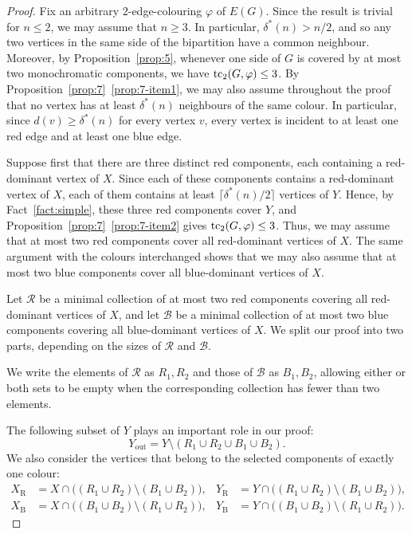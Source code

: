 \documentclass[12pt,reqno,a4paper]{amsart}
\def\tc{\mathop{\text{\rm tc}}\nolimits}
\newcommand{\out}{\mathrm{out}}
\newcommand{\R}{\mathrm{R}}
\newcommand{\B}{\mathrm{B}}
\begin{document}
\begin{proof}
Fix an arbitrary $2$-edge-colouring $\varphi$ of $E(G)$.
Since the result is trivial for $n\le 2$, we may assume that $n\ge 3$. In
particular, $\delta^*(n)>n/2$, and so any two vertices in the same side of the
bipartition have a common neighbour. Moreover, by Proposition~\ref{prop:5},
whenever one side of $G$ is covered by at most two monochromatic components, we
have $\tc_2(G,\varphi)\le 3$. By Proposition~\ref{prop:7}~\ref{prop:7-item1}, we may
also assume throughout the proof that no vertex has at least $\delta^*(n)$
neighbours of the same colour. In particular, since $d(v)\ge \delta^*(n)$ for
every vertex $v$, every vertex is incident to at least one red edge and at least
one blue edge.
 
Suppose first that there are three distinct red components, each containing a
red-dominant vertex of $X$. Since each of these components contains a
red-dominant vertex of $X$, each of them contains at least $\lceil
\delta^*(n)/2\rceil$ vertices of $Y$. Hence, by Fact~\ref{fact:simple}, these
three red components cover $Y$, and Proposition~\ref{prop:7}~\ref{prop:7-item2}
gives $\tc_2(G,\varphi)\le 3$. Thus, we may assume that at most two red components cover
all red-dominant vertices of $X$. The same argument with the colours
interchanged shows that we may also assume that at most two blue components
cover all blue-dominant vertices of $X$.

Let $\mathcal R$ be a minimal collection of at most two red components covering
all red-dominant vertices of $X$, and let $\mathcal B$ be a minimal collection
of at most two blue components covering all blue-dominant vertices of $X$. We
split our proof into two parts, depending on the sizes of $\mathcal R$ and
$\mathcal B$.

We write the elements of $\mathcal R$ as $R_1,R_2$ and those of $\mathcal B$ as
$B_1,B_2$, allowing either or both sets to be empty when the
corresponding collection has fewer than two elements.

The following subset of $Y$ plays an important role in our proof:
\begin{equation*}
Y_{\out} = Y \setminus (R_1 \cup R_2 \cup B_1 \cup B_2).
\end{equation*}
We also consider the vertices that belong to the selected components of exactly
one colour:
\begin{align*}
X_{\R} &= X\cap\bigl((R_1\cup R_2)\setminus(B_1\cup B_2)\bigr), &
Y_{\R} &= Y\cap\bigl((R_1\cup R_2)\setminus(B_1\cup B_2)\bigr),\\
X_{\B} &= X\cap\bigl((B_1\cup B_2)\setminus(R_1\cup R_2)\bigr), &
Y_{\B} &= Y\cap\bigl((B_1\cup B_2)\setminus(R_1\cup R_2)\bigr).
\end{align*}


\end{proof}
\end{document}
